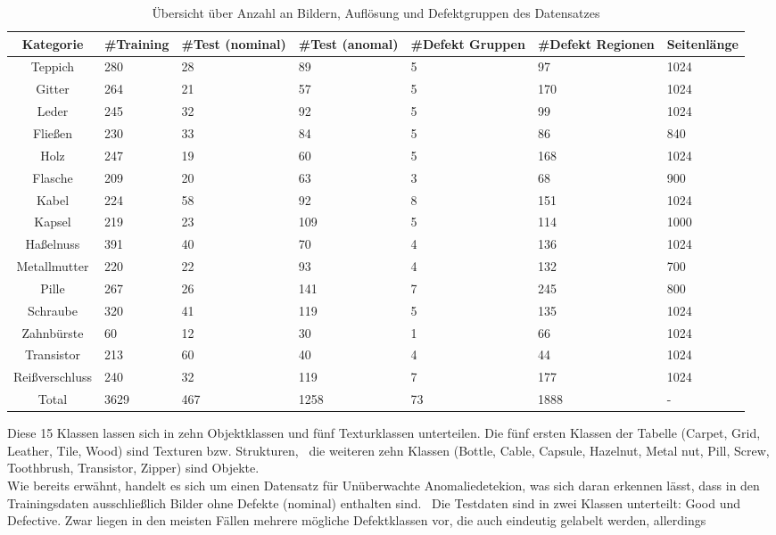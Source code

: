 \begin{table}[h]
  \centering
  \begin{tabular}{|c|p{1.8cm}|p{1.8cm}|p{1.8cm}|p{1.8cm}|p{1.8cm}|p{1.8cm}|}
  \hline
  Kategorie & \#Training & \#Test (nominal) & \#Test (anomal) & \#Defekt Gruppen & \#Defekt Regionen & Seitenlänge  \\
  \hline
  Teppich & 280 & 28 & 89 & 5 & 97 & 1024 \\ 
  Gitter & 264 & 21 & 57 & 5 & 170 & 1024 \\
  Leder & 245 & 32 & 92 & 5 & 99 & 1024 \\ 
  Fließen & 230 & 33 & 84 & 5 & 86 & 840 \\
  Holz & 247 & 19 & 60 & 5 & 168 & 1024  \\ 
  Flasche & 209 & 20 & 63 & 3 & 68 & 900 \\
  Kabel & 224 & 58 & 92 & 8 & 151 & 1024 \\ 
  Kapsel & 219 & 23 & 109 & 5 & 114 & 1000 \\
  Haßelnuss & 391 & 40 & 70 & 4 & 136 & 1024 \\ 
  Metallmutter & 220 & 22 & 93 & 4 & 132 & 700 \\
  Pille & 267 & 26 & 141 & 7 & 245 & 800 \\ 
  Schraube & 320 & 41 & 119 & 5 & 135 & 1024 \\
  Zahnbürste & 60 & 12 & 30 & 1 & 66 & 1024 \\ 
  Transistor & 213 & 60 & 40 & 4 & 44 & 1024 \\
  Reißverschluss & 240 & 32 & 119 & 7 & 177 & 1024 \\
  \hline
  Total & 3629 & 467 & 1258 & 73 & 1888 & - \\
  \hline
  \end{tabular}
  \caption{Übersicht über Anzahl an Bildern, Auflösung und Defektgruppen des Datensatzes}
  \label{tab:mvtecad_overview}
\end{table}
Diese 15 Klassen lassen sich in zehn Objektklassen und fünf Texturklassen unterteilen. Die fünf ersten Klassen der Tabelle (Carpet, Grid, Leather, Tile, Wood) sind Texturen bzw. Strukturen, \
die weiteren zehn Klassen (Bottle, Cable, Capsule, Hazelnut, Metal nut, Pill, Screw, Toothbrush, Transistor, Zipper) sind Objekte. \\
Wie bereits erwähnt, handelt es sich um einen Datensatz für Unüberwachte Anomaliedetekion, was sich daran erkennen lässt, dass in den Trainingsdaten ausschließlich Bilder ohne Defekte (nominal) enthalten sind. \
Die Testdaten sind in zwei Klassen unterteilt: \glqq Good\grqq{} und \glqq Defective\grqq{}. Zwar liegen in den meisten Fällen mehrere mögliche Defektklassen vor, die auch eindeutig gelabelt werden, allerdings \
